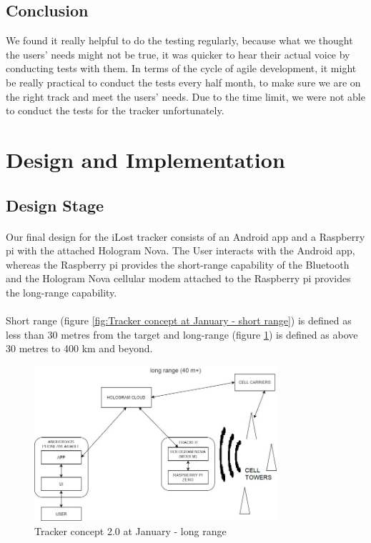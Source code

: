 \documentclass[12pt,a4paper]{article}
\begin{document}
        \subsection{Conclusion}
          We found it really helpful to do the testing regularly, because what we thought the users' needs might not be true, it was quicker to hear their actual voice by conducting tests with them. In terms of the cycle of agile development, it might be really practical to conduct the tests every half month, to make sure we are on the right track and meet the users' needs.           
          Due to the time limit, we were not able to conduct the tests for the tracker unfortunately.
      
    \section{Design and Implementation}
      \subsection{Design Stage}
        \paragraph{} Our final design for the iLost tracker consists of an Android app and a Raspberry pi with the attached Hologram Nova. The User interacts with the Android app, whereas the Raspberry pi provides the short-range capability of the Bluetooth and the Hologram Nova cellular modem attached to the Raspberry pi provides the long-range capability.

        \paragraph{} Short range (figure \ref{fig:Tracker concept at January - short range}) is defined as less than 30 metres from the target and long-range (figure \ref{fig:Tracker concept at January - long range}) is defined as above 30 metres to 400 km and beyond.
        
        \begin{figure}[H]
          \centering
          \includegraphics[width=0.8\textwidth]{../assets/design-concept-v20-long-range.jpg}
          \caption{Tracker concept 2.0 at January - long range}
          \label{fig:Tracker concept at January - long range}
        \end{figure}
        
\end{document}
